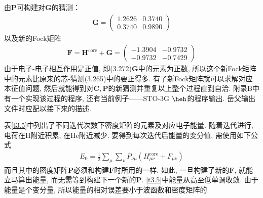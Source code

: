 由$\mathbf{P}$可构建对$\mathbf{G}$的猜测：
\begin{align}
\mathbf{G}=\begin{pmatrix}
1.2626&0.3740\\0.3740&0.9890
\end{pmatrix}
\end{align}
以及新的Fock矩阵
\begin{align}
\mathbf{F=H}^\mathrm{core}+\mathbf{G}=
\begin{pmatrix}
-1.3904&-0.9732 \\ -0.9732&-0.7429
\end{pmatrix}
\end{align}
由于电子-电子相互作用是正值, 即(3.272)$\mathbf{G}$中的元素为正数, 所以这个新Fock矩阵中的元素比原来的芯-\ha 猜测(3.265)中的要正得多. 有了新Fock矩阵就可以求解对应本征值问题, 然后就能得到对$\mathbf{C,P}$的新猜测并重复以上整个过程直到自洽. 附录B中有一个实现该过程的程序, 还有当前例子——STO-3G $\heh$的程序输出. 岳父输出文件时应配以接下来的描述.

表\ref{t3.5}中列出了不同迭代次数下密度矩阵的元素及对应电子能量. 随着迭代进行, 电荷在$\mathrm{H}$附近积累, 在$\mathrm{He}$附近减少. 要得到每次迭代后能量的变分值, 需使用如下公式
\begin{align}
E_0 = \frac{1}{2}\sum_\mu\sum_\nu P_{\nu\mu}(H_{\mu\nu}^\mathrm{core}+F_{\mu\nu})
\end{align}
而且其中的密度矩阵$\mathbf{P}$必须和构建$\mathbf{F}$时所用的一样. 如此, 一旦构建了新的$\mathbf{F}$, 就能立马算出能量, 而无需等到构建下一个新的$\mathbf{P}$. 
\ref{t3.5}中能量从高至低单调收敛. 由于能量是个变分量, 所以能量的相对误差要小于波函数和密度矩阵的. 

